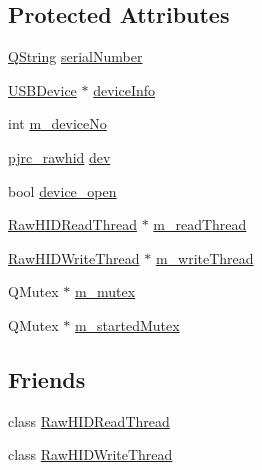 \subsection*{\-Protected \-Attributes}
\begin{DoxyCompactItemize}
\item 
\hyperlink{group___u_a_v_objects_plugin_gab9d252f49c333c94a72f97ce3105a32d}{\-Q\-String} \hyperlink{group___raw_h_i_d_plugin_ga0b5d9bd4ac69612199afa5b59dfc3ed6}{serial\-Number}
\item 
\hyperlink{class_u_s_b_device}{\-U\-S\-B\-Device} $\ast$ \hyperlink{group___raw_h_i_d_plugin_gab9b0f096459d4bc5a220ac42e9465752}{device\-Info}
\item 
int \hyperlink{group___raw_h_i_d_plugin_ga0dde2d900a5f9cbd059e528de3f0c73b}{m\-\_\-device\-No}
\item 
\hyperlink{classpjrc__rawhid}{pjrc\-\_\-rawhid} \hyperlink{group___raw_h_i_d_plugin_ga4939588bf5bf31e39139a75ca4319884}{dev}
\item 
bool \hyperlink{group___raw_h_i_d_plugin_ga6ec3ad7c063679816e5aafed60f677c3}{device\-\_\-open}
\item 
\hyperlink{class_raw_h_i_d_read_thread}{\-Raw\-H\-I\-D\-Read\-Thread} $\ast$ \hyperlink{group___raw_h_i_d_plugin_gaecb703f979aac429ee3961f52c998b53}{m\-\_\-read\-Thread}
\item 
\hyperlink{class_raw_h_i_d_write_thread}{\-Raw\-H\-I\-D\-Write\-Thread} $\ast$ \hyperlink{group___raw_h_i_d_plugin_ga103f382a48fee4b9fe034b3d88f45d42}{m\-\_\-write\-Thread}
\item 
\-Q\-Mutex $\ast$ \hyperlink{group___raw_h_i_d_plugin_ga915d676c812135bc006e37a140a52365}{m\-\_\-mutex}
\item 
\-Q\-Mutex $\ast$ \hyperlink{group___raw_h_i_d_plugin_ga62ee841aa1de86d73cfd1b9bc7a5d719}{m\-\_\-started\-Mutex}
\end{DoxyCompactItemize}
\subsection*{\-Friends}
\begin{DoxyCompactItemize}
\item 
class \hyperlink{group___raw_h_i_d_plugin_ga8ff6a2bdea09543bed5912710ec13dab}{\-Raw\-H\-I\-D\-Read\-Thread}
\item 
class \hyperlink{group___raw_h_i_d_plugin_ga2d3d87c46461ab8d3746b207989bb7f8}{\-Raw\-H\-I\-D\-Write\-Thread}
\end{DoxyCompactItemize}


